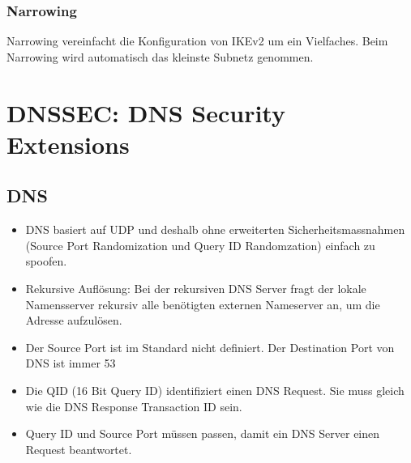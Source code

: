 \subsubsection{Narrowing}
Narrowing vereinfacht die Konfiguration von IKEv2 um ein Vielfaches. Beim Narrowing wird automatisch das kleinste Subnetz genommen.

\section{DNSSEC: DNS Security Extensions}

\subsection{DNS}
\begin{itemize}
	\item DNS basiert auf UDP und deshalb ohne erweiterten Sicherheitsmassnahmen (Source Port Randomization und Query ID Randomzation) einfach zu spoofen.
	\item Rekursive Auflösung: Bei der rekursiven DNS Server fragt der lokale Namensserver rekursiv alle benötigten externen Nameserver an, um die Adresse aufzulösen.
	\item Der Source Port ist im Standard nicht definiert. Der Destination Port von DNS ist immer 53
	\item Die QID (16 Bit Query ID) identifiziert einen DNS Request. Sie muss gleich wie die DNS Response Transaction ID sein.
	\item Query ID und Source Port müssen passen, damit ein DNS Server einen Request beantwortet.
\end{itemize}
